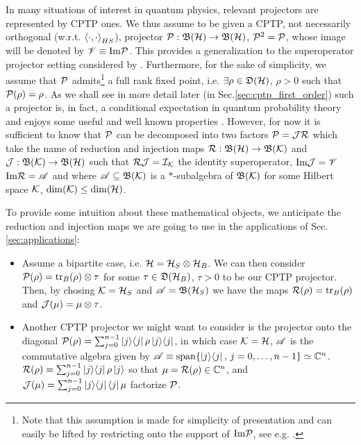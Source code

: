 \documentclass[10pt,aps,pra,twocolumn,showpacs,superscriptaddress,nobalancelastpage,notitlepage,nofootinbib,longbibliography]{revtex4-2}
\begin{document}
In many situations of interest in quantum physics, relevant projectors are represented by CPTP ones. We thus assume to be given a CPTP, not necessarily orthogonal (w.r.t. $\left< \cdot,\cdot \right>_{HS}$), projector $\mathcal{P}:\mathfrak{B}(\mathcal{H})\to\mathfrak{B}(\mathcal{H})$, $\mathcal{P}^2=\mathcal{P}$, whose image will be denoted by $\mathscr{V} \equiv {\rm Im}\mathcal{P}$. This provides a generalization to the superoperator projector setting considered by \cite{breuer2006,breuer2007}.  Furthermore, for the sake of simplicity, we assume that $\mathcal{P}$ admits\footnote{Note that this assumption is made for simplicity of presentation and can easily be lifted by restricting onto the support of ${\rm Im}\mathcal{P}$, see e.g. \cite{wolf2012quantum}.} a full rank fixed point, i.e. $\exists\rho\in\mathfrak{D}(\mathcal{H})$, $\rho>0$ such that $\mathcal{P}(\rho)=\rho$. 
As we shall see in more detail later (in Sec.\ref{sec:cptp_first_order}) such a projector is, in fact, a conditional expectation in quantum probability theory \cite{petz2007quantum,blackadar2006operator} and enjoys some useful and well known properties \cite{lindblad1999general, wolf2012quantum, ticozzi2017alternating, bialonczyk2018application, blume2010information,grigoletto2024exact,wolf2010inverseeigenvalueproblemquantum}. However, for now it is sufficient to know that $\mathcal{P}$ can be decomposed into two factors $\mathcal{P} = \mathcal{J}\mathcal{R}$ which take the name of reduction and injection maps $\mathcal{R}:\mathfrak{B}(\mathcal{H})\to\mathfrak{B}(\mathcal{K})$ and $\mathcal{J}:\mathfrak{B}(\mathcal{K})\to\mathfrak{B}(\mathcal{H})$ such that $\mathcal{R}\mathcal{J} = \mathcal{I}_{\mathcal{K}}$ the identity superoperator, ${\rm Im}\mathcal{J} = \mathscr{V}$ ${\rm Im}\mathcal{R}=\mathscr{A}$ and where $\mathscr{A}\subseteq\mathfrak{B}(\mathcal{K})$ is a $*$-subalgebra of $\mathfrak{B}(\mathcal{K})$ for some Hilbert space $\mathcal{K}$, $\dim(\mathcal{K})\leq\dim(\mathcal{H})$.

To provide some intuition about these mathematical objects, we anticipate the reduction and injection maps we are going to use in the applications of Sec.\,\ref{sec:applications}:
\begin{itemize}
    \item Assume a bipartite case, i.e. $\mathcal{H}=\mathcal{H}_S\otimes\mathcal{H}_B$. We can then consider $\mathcal{P}(\rho) = {\rm tr}_B(\rho)\otimes\tau$ for some $\tau\in\mathfrak{D}(\mathcal{H}_B)$, $\tau>0$ to be our CPTP projector. Then, by chosing $\mathcal{K}=\mathcal{H}_S$ and $\mathscr{A}=\mathfrak{B}(\mathcal{H}_S)$ we have the maps $\mathcal{R}(\rho) = {\rm tr}_B(\rho)$ and $\mathcal{J}(\mu) = \mu\otimes\tau$.
    \item Another CPTP projector we might want to consider is the projector onto the diagonal $\mathcal{P}(\rho)= \sum_{j=0}^{n-1} \left\vert j \middle>\middle< j \right\vert \rho \left\vert j \middle>\middle< j \right\vert$, in which case $\mathcal{K}=\mathcal{H}$, $\mathscr{A}$ is the commutative algebra given by $\mathscr{A}\equiv{\rm span}\{\left\vert j \middle>\middle< j \right\vert,\, j=0,\dots,n-1\}\simeq\mathbb{C}^n$. $\mathcal{R}(\rho) = \sum_{j=0}^{n-1} \left\vert j \middle>\middle< j \right\vert\rho \left| j \right>$ so that $\mu=\mathcal{R}(\rho)\in\mathbb{C}^n$, and $\mathcal{J}(\mu)=\sum_{j=0}^{n-1} \left\vert j \middle>\middle< j \right\vert \left< j \right|\mu$ factorize $\mathcal{P}$.
\end{itemize}
\end{document}
